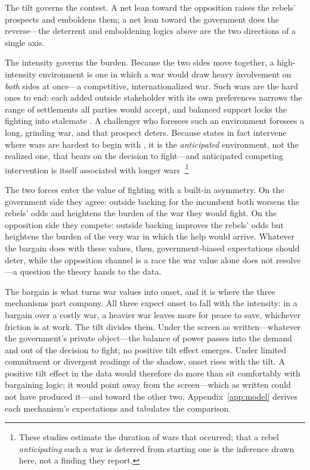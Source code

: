 The tilt governs the contest.  A net lean toward the opposition raises the
rebels' prospects and emboldens them; a net lean toward the government does the
reverse---the deterrent and emboldening logics above are the two directions of
a single axis.

The intensity governs the burden.  Because the two sides move together, a
high-intensity environment is one in which a war would draw heavy involvement
on \emph{both} sides at once---a competitive, internationalized war.  Such wars
are the hard ones to end: each added outside stakeholder with its own
preferences narrows the range of settlements all parties would accept, and
balanced support locks the fighting into stalemate \citep{cunningham2006,
cunningham2010, balchlindsayjoyce2008}.  A challenger who foresees such an
environment foresees a long, grinding war, and that prospect deters.  Because
states in fact intervene where wars are hardest to begin with \citep{gent2008,
gilligansergenti2008}, it is the \emph{anticipated} environment, not the
realized one, that bears on the decision to fight---and anticipated competing
intervention is itself associated with longer wars
\citep{akcinarogluradziszewski2005}.\footnote{These studies estimate the
duration of wars that occurred; that a rebel \emph{anticipating} such a war is
deterred from starting one is the inference drawn here, not a finding they
report.}

The two forces enter the value of fighting with a built-in asymmetry.  On
the government side they agree: outside backing for the incumbent both
worsens the rebels' odds and heightens the burden of the war they would
fight.  On the opposition side they compete: outside backing improves the
rebels' odds but heightens the burden of the very war in which the help would
arrive.  Whatever the bargain does with these values, then, government-biased
expectations should deter, while the opposition channel is a race the war
value alone does not resolve---a question the theory hands to the data.

The bargain is what turns war values into onset, and it is where the three
mechanisms part company.  All three expect onset to fall with the intensity:
in a bargain over a costly war, a heavier war leaves more for peace to save,
whichever friction is at work.  The tilt divides them.  Under the screen as
written---whatever the government's private object---the balance of power
passes into the demand and out of the decision to fight; no positive tilt
effect emerges.  Under limited commitment or divergent readings of the
shadow, onset rises with the tilt.  A positive tilt effect in the data would
therefore do more than sit comfortably with bargaining logic; it would point
away from the screen---which as written could not have produced it---and toward
the other two.
Appendix~\ref{app:model} derives each mechanism's expectations and tabulates
the comparison.


